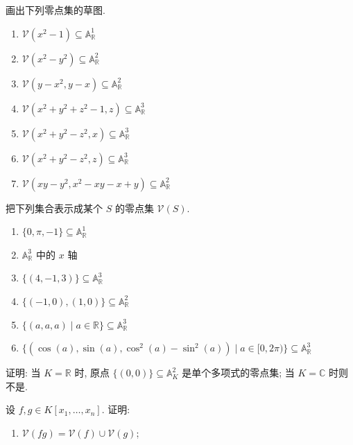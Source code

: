 \BookExerciseHeading
\begin{BookExercises}
  \item\label{ex:sketch-vanishing-sets} 画出下列零点集的草图.
    \begin{enumerate}[label=(\alph*)]
      \item $\mathcal{V}(x^{2}-1)\subseteq\mathbb{A}^{1}_{\mathbb{R}}$
      \item $\mathcal{V}(x^{2}-y^{2})\subseteq\mathbb{A}^{2}_{\mathbb{R}}$
      \item $\mathcal{V}(y-x^{2},y-x)\subseteq\mathbb{A}^{2}_{\mathbb{R}}$
      \item $\mathcal{V}(x^{2}+y^{2}+z^{2}-1,z)\subseteq\mathbb{A}^{3}_{\mathbb{R}}$
      \item $\mathcal{V}(x^{2}+y^{2}-z^{2},x)\subseteq\mathbb{A}^{3}_{\mathbb{R}}$
      \item $\mathcal{V}(x^{2}+y^{2}-z^{2},z)\subseteq\mathbb{A}^{3}_{\mathbb{R}}$
      \item $\mathcal{V}(xy-y^{2},x^{2}-xy-x+y)\subseteq\mathbb{A}^{2}_{\mathbb{R}}$
    \end{enumerate}
  \item\label{ex:express-sets-by-polynomials} 把下列集合表示成某个 $S$ 的零点集 $\mathcal{V}(S)$.
    \begin{enumerate}[label=(\alph*)]
      \item $\{0,\pi,-1\}\subseteq\mathbb{A}^{1}_{\mathbb{R}}$
      \item $\mathbb{A}^{3}_{\mathbb{R}}$ 中的 $x$ 轴
      \item $\{(4,-1,3)\}\subseteq\mathbb{A}^{3}_{\mathbb{R}}$
      \item $\{(-1,0),(1,0)\}\subseteq\mathbb{A}^{2}_{\mathbb{R}}$
      \item $\{(a,a,a)\mid a\in\mathbb{R}\}\subseteq\mathbb{A}^{3}_{\mathbb{R}}$
      \item $\{(\cos(a),\sin(a),\cos^{2}(a)-\sin^{2}(a))\mid a\in[0,2\pi)\}\subseteq\mathbb{A}^{3}_{\mathbb{R}}$
    \end{enumerate}
  \item\label{ex:origin-over-real-or-complex} 证明: 当 $K=\mathbb{R}$ 时, 原点 $\{(0,0)\}\subseteq\mathbb{A}^{2}_{K}$ 是单个多项式的零点集; 当 $K=\mathbb{C}$ 时则不是.
  \item\label{ex:union-and-intersection-of-vanishing-sets} 设 $f,g\in K[x_{1},\ldots,x_{n}]$. 证明:
    \begin{enumerate}[label=(\alph*)]
      \item $\mathcal{V}(fg)=\mathcal{V}(f)\cup\mathcal{V}(g)$;

\end{enumerate}
\end{BookExercises}
